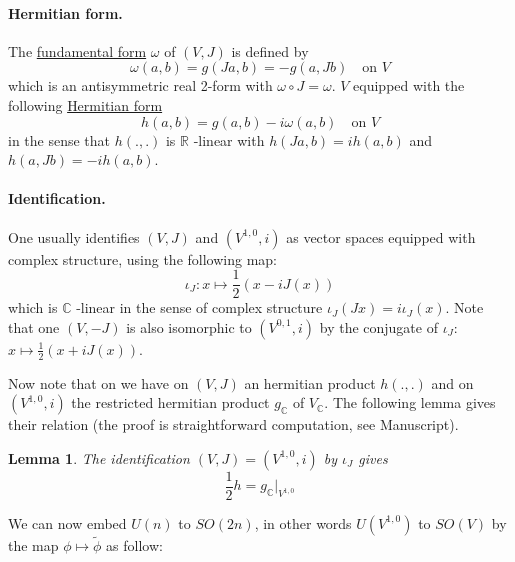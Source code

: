 \documentclass[11pt]{article}
\newtheorem{lemma}[theorem]{Lemma}
\begin{document}
\paragraph*{Hermitian form.}
\label{sec:org4b82a96}
The \uline{fundamental form} \(\omega\) of \((V,J)\) is defined by
\[
\omega(a,b) = g(Ja,b) = -g(a, Jb) \quad \text{on } V
\]
which is an antisymmetric real 2-form with \(\omega\circ J = \omega\). \(V\) equipped with the following
\uline{Hermitian form}
\[
h(a,b) = g(a,b) - i\omega(a,b)  \quad \text{on } V
\]
in the sense that \(h(.,.)\) is \(\mathbb{R}\) -linear with \(h(Ja,b) = ih(a,b)\) and \(h(a,Jb) = -ih(a,b)\).

\paragraph*{Identification.}
\label{sec:orga0f474a}
One usually identifies \((V,J)\) and \((V^{1,0},i)\) as vector spaces equipped with complex structure,
using the following map:
\[
\iota_J: x \mapsto \frac{1}{2}(x - iJ(x))
\]
which is \(\mathbb{C}\) -linear in the sense of complex structure \(\iota_J(Jx) = i\iota_J(x)\). Note
that one \((V,-J)\) is also isomorphic to \((V^{0,1},i)\) by the conjugate of \(\iota_J\): \(x\mapsto
\frac{1}{2}(x + iJ(x))\).

Now note that on we have on \((V,J)\) an hermitian product \(h(.,.)\) and on \((V^{1,0},i)\) the restricted
hermitian product \(g_{\mathbb{C}}\) of \(V_{\mathbb{C}}\). The following lemma gives their relation
(the proof is straightforward computation, see Manuscript).

\begin{lemma}
The identification \((V,J) = (V^{1,0},i)\) by \(\iota_J\) gives
\[
\frac{1}{2}h = g_\mathbb{C}|_{V^{1,0}}
\]
\end{lemma}


We can now embed \(U(n)\) to \(SO(2n)\), in other words \(U(V^{1,0})\) to \(SO(V)\) by the map
\(\phi\mapsto \tilde\phi\) as follow:
\end{document}
